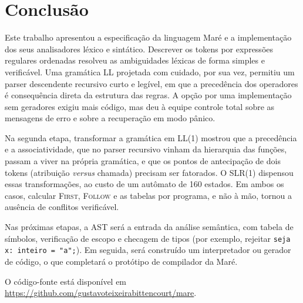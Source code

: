\documentclass[conference]{IEEEtran}
\begin{document}
\section{Conclusão}\label{sec:concl}

Este trabalho apresentou a especificação da linguagem Maré e a implementação
dos seus analisadores léxico e sintático. Descrever os tokens por expressões
regulares ordenadas resolveu as ambiguidades léxicas de forma simples e
verificável. Uma gramática LL projetada com cuidado, por sua vez, permitiu um
parser descendente recursivo curto e legível, em que a precedência dos
operadores é consequência direta da estrutura das regras. A opção por uma
implementação sem geradores exigiu mais código, mas deu à equipe controle
total sobre as mensagens de erro e sobre a recuperação em modo pânico.

Na segunda etapa, transformar a gramática em LL(1) mostrou que a
precedência e a associatividade, que no parser recursivo vinham da hierarquia
das funções, passam a viver na própria gramática, e que os pontos de
antecipação de dois tokens (atribuição \emph{versus} chamada) precisam ser
fatorados. O SLR(1) dispensou essas transformações, ao custo de um autômato de
160 estados. Em ambos os casos, calcular \textsc{First}, \textsc{Follow} e as
tabelas por programa, e não à mão, tornou a ausência de conflitos verificável.

Nas próximas etapas, a AST será a entrada da análise semântica, com tabela de
símbolos, verificação de escopo e checagem de tipos (por exemplo, rejeitar
\texttt{seja x: inteiro = "a";}). Em seguida, será construído um
interpretador ou gerador de código, o que completará o protótipo de
compilador da Maré.

O código-fonte está disponível em
\url{https://github.com/gustavoteixeirabittencourt/mare}.
\end{document}
